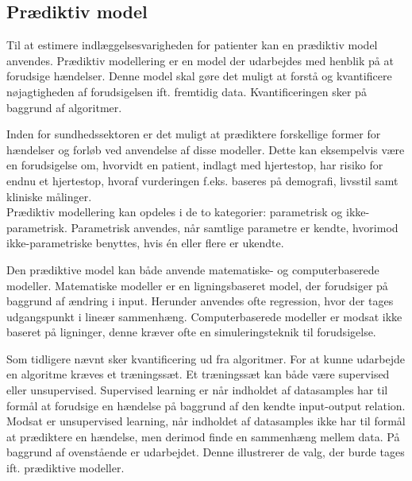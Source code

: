 \subsection{Prædiktiv model} \label{prae_model}
\noindent
Til at estimere indlæggelsesvarigheden for patienter kan en prædiktiv model anvendes. 
Prædiktiv modellering er en model der udarbejdes med henblik på at forudsige hændelser.  Denne model skal gøre det muligt at forstå og kvantificere nøjagtigheden af forudsigelsen ift. fremtidig data.\cite{Kuhn2013} Kvantificeringen sker på baggrund af algoritmer. 


Inden for sundhedssektoren er det muligt at prædiktere forskellige former for hændelser og forløb ved anvendelse af disse modeller. Dette kan eksempelvis være en forudsigelse om, hvorvidt en patient, indlagt med hjertestop, har risiko for endnu et hjertestop, hvoraf vurderingen f.eks. baseres på demografi, livsstil samt kliniske målinger\cite{Hastie2008}.  \\

\noindent
Prædiktiv modellering kan opdeles i de to kategorier: parametrisk og ikke-parametrisk. Parametrisk anvendes, når samtlige parametre er kendte, hvorimod ikke-parametriske benyttes, hvis én eller flere er ukendte.\cite{Sheskin2000} %


Den prædiktive model kan både anvende matematiske- og computerbaserede modeller. Matematiske modeller er en ligningsbaseret model, der forudsiger på baggrund af ændring i input. Herunder anvendes ofte regression, hvor der tages udgangspunkt i lineær sammenhæng. Computerbaserede modeller er modsat ikke baseret på ligninger, denne kræver ofte en simuleringsteknik til forudsigelse.\cite{MathWorks2016}


Som tidligere nævnt sker kvantificering ud fra algoritmer. For at kunne udarbejde en algoritme kræves et træningssæt\cite{DIKU2010}. Et træningssæt kan både være supervised eller unsupervised. Supervised learning er når indholdet af datasamples har til formål at forudsige en hændelse på baggrund af den kendte input-output relation\cite{Brownlee2013}. Modsat er unsupervised learning, når indholdet af datasamples ikke har til formål at prædiktere en hændelse, men derimod finde en sammenhæng mellem data\cite{Brownlee2013, Kuhn2013}. %
På baggrund af ovenstående er  udarbejdet. Denne illustrerer de valg, der burde tages ift. prædiktive modeller.


